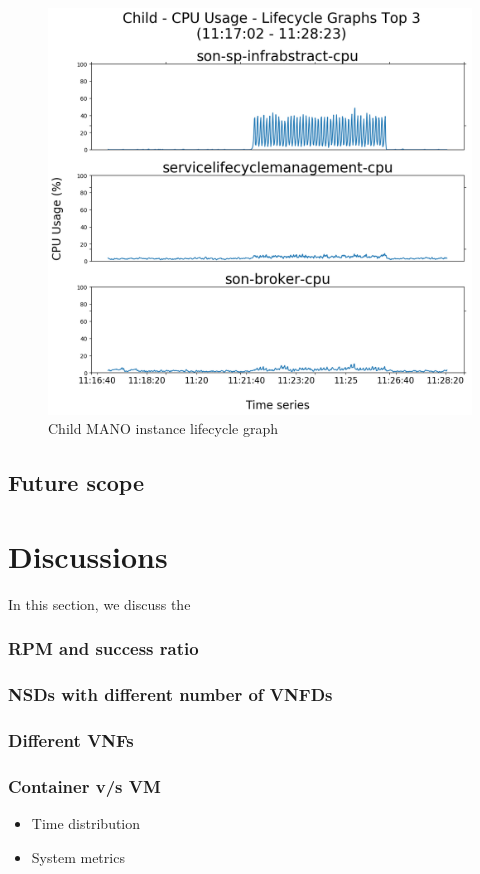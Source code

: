 \begin{figure}
	\centering
	\includegraphics[width=0.65\linewidth]{figures/scalability_graphs/Scalability-Evaluation/Child-TOP-3-Lifecycle}
	\caption{Child MANO instance lifecycle graph}
	\label{fig:child-top-3-lifecycle}
\end{figure}



\subsection{Future scope}

\pagebreak

\section{Discussions}

In this section, we discuss the 

\subsubsection{RPM and success ratio}
\subsubsection{NSDs with different number of VNFDs}
\subsubsection{Different VNFs}
\subsubsection{Container v/s VM}
\begin{itemize}
	\item Time distribution
	\item System metrics
\end{itemize}
